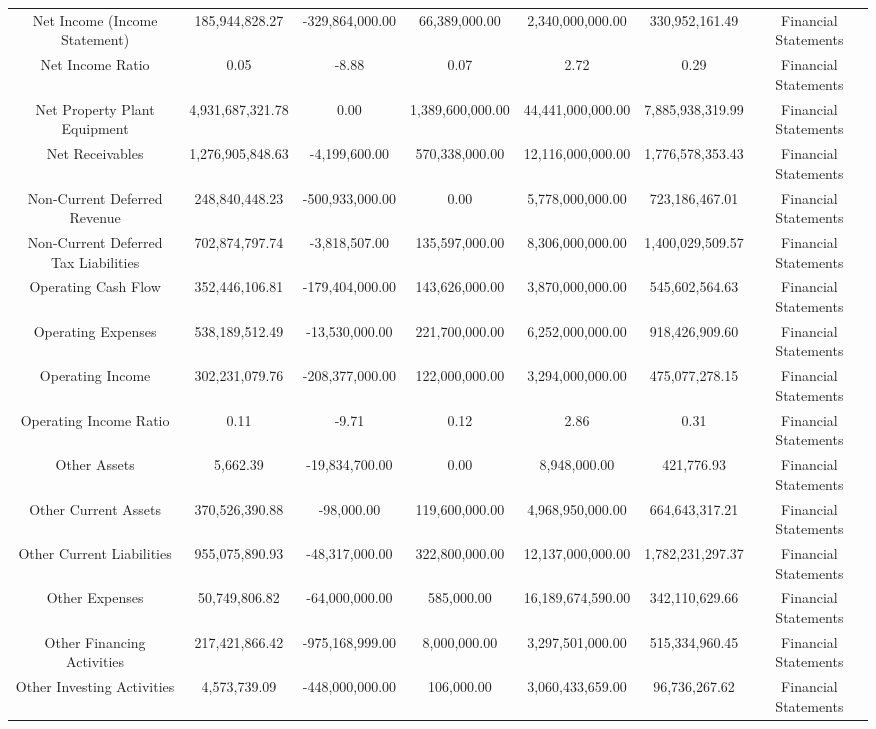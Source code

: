 \begin{longtable}{ccccccc}
Net Income (Income Statement) & 185,944,828.27 & -329,864,000.00 & 66,389,000.00 & 2,340,000,000.00 & 330,952,161.49 & Financial Statements \\
Net Income Ratio & 0.05 & -8.88 & 0.07 & 2.72 & 0.29 & Financial Statements \\
Net Property Plant Equipment & 4,931,687,321.78 & 0.00 & 1,389,600,000.00 & 44,441,000,000.00 & 7,885,938,319.99 & Financial Statements \\
Net Receivables & 1,276,905,848.63 & -4,199,600.00 & 570,338,000.00 & 12,116,000,000.00 & 1,776,578,353.43 & Financial Statements \\
Non-Current Deferred Revenue & 248,840,448.23 & -500,933,000.00 & 0.00 & 5,778,000,000.00 & 723,186,467.01 & Financial Statements \\
Non-Current Deferred Tax Liabilities & 702,874,797.74 & -3,818,507.00 & 135,597,000.00 & 8,306,000,000.00 & 1,400,029,509.57 & Financial Statements \\
Operating Cash Flow & 352,446,106.81 & -179,404,000.00 & 143,626,000.00 & 3,870,000,000.00 & 545,602,564.63 & Financial Statements \\
Operating Expenses & 538,189,512.49 & -13,530,000.00 & 221,700,000.00 & 6,252,000,000.00 & 918,426,909.60 & Financial Statements \\
Operating Income & 302,231,079.76 & -208,377,000.00 & 122,000,000.00 & 3,294,000,000.00 & 475,077,278.15 & Financial Statements \\
Operating Income Ratio & 0.11 & -9.71 & 0.12 & 2.86 & 0.31 & Financial Statements \\
Other Assets & 5,662.39 & -19,834,700.00 & 0.00 & 8,948,000.00 & 421,776.93 & Financial Statements \\
Other Current Assets & 370,526,390.88 & -98,000.00 & 119,600,000.00 & 4,968,950,000.00 & 664,643,317.21 & Financial Statements \\
Other Current Liabilities & 955,075,890.93 & -48,317,000.00 & 322,800,000.00 & 12,137,000,000.00 & 1,782,231,297.37 & Financial Statements \\
Other Expenses & 50,749,806.82 & -64,000,000.00 & 585,000.00 & 16,189,674,590.00 & 342,110,629.66 & Financial Statements \\
Other Financing Activities & 217,421,866.42 & -975,168,999.00 & 8,000,000.00 & 3,297,501,000.00 & 515,334,960.45 & Financial Statements \\
Other Investing Activities & 4,573,739.09 & -448,000,000.00 & 106,000.00 & 3,060,433,659.00 & 96,736,267.62 & Financial Statements \\

\end{longtable}
